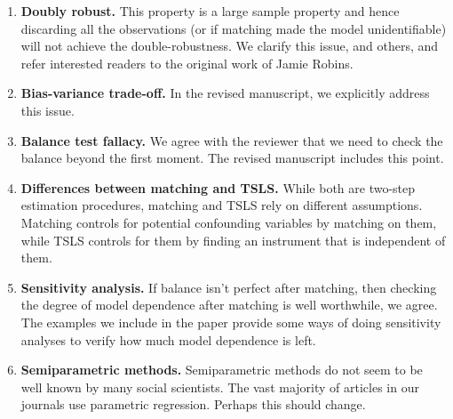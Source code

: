 \documentclass[11pt]{article}
\begin{document}
\begin{enumerate}
\item {\bf Doubly robust.} This property is a large sample property
  and hence discarding all the observations (or if matching made the
  model unidentifiable) will not achieve the double-robustness.  We
  clarify this issue, and others, and refer interested readers to the
  original work of Jamie Robins.
 
\item {\bf Bias-variance trade-off.} In the revised manuscript, we
  explicitly address this issue.

\item {\bf Balance test fallacy.} We agree with the reviewer that we
  need to check the balance beyond the first moment.  The revised
  manuscript includes this point.


\item {\bf Differences between matching and TSLS.} While both are
  two-step estimation procedures, matching and TSLS rely on different
  assumptions. Matching controls for potential confounding variables
  by matching on them, while TSLS controls for them by finding an
  instrument that is independent of them.
  
\item {\bf Sensitivity analysis.} If balance isn't perfect after
  matching, then checking the degree of model dependence after
  matching is well worthwhile, we agree.  The examples we include in
  the paper provide some ways of doing sensitivity analyses to verify
  how much model dependence is left.

\item {\bf Semiparametric methods.} Semiparametric methods do not seem
  to be well known by many social scientists.  The vast majority of
  articles in our journals use parametric regression.  Perhaps this
  should change.

\end{enumerate}
\end{document}
